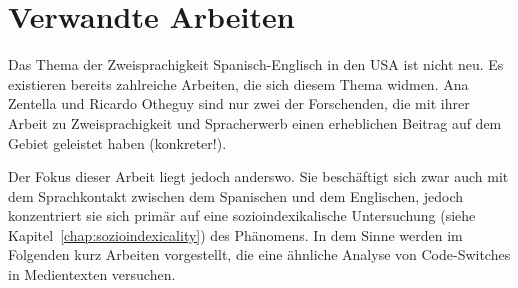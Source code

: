 \section{Verwandte Arbeiten}
\label{chap:related-works}

Das Thema der Zweisprachigkeit Spanisch-Englisch in den USA ist nicht neu.
Es existieren bereits zahlreiche Arbeiten, die sich diesem Thema widmen.
Ana Zentella und Ricardo Otheguy sind nur zwei der Forschenden, die mit ihrer Arbeit zu Zweisprachigkeit und Spracherwerb einen erheblichen Beitrag auf dem Gebiet geleistet haben (konkreter!). %

Der Fokus dieser Arbeit liegt jedoch anderswo.
Sie beschäftigt sich zwar auch mit dem Sprachkontakt zwischen dem Spanischen und dem Englischen, jedoch konzentriert sie sich primär auf eine sozioindexikalische Untersuchung (siehe Kapitel~\ref{chap:sozioindexicality}) des Phänomens.
In dem Sinne werden im Folgenden kurz Arbeiten vorgestellt, die eine ähnliche Analyse von Code-Switches in Medientexten versuchen.

